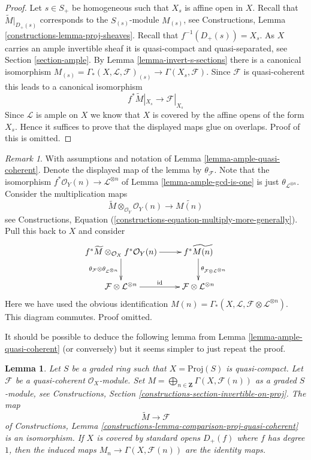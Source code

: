 \documentclass{stacks-project}
\theoremstyle{plain}
\newtheorem{lemma}[subsection]{Lemma}
\theoremstyle{definition}
\theoremstyle{remark}
\newtheorem{remark}[subsection]{Remark}
\numberwithin{equation}{subsection}
\begin{document}
\begin{proof}
Let $s \in S_{+}$ be homogeneous such that $X_s$ is affine open in $X$.
Recall that $\widetilde{M}|_{D_{+}(s)}$ corresponds to the
$S_{(s)}$-module $M_{(s)}$, see
Constructions, Lemma \ref{constructions-lemma-proj-sheaves}.
Recall that $f^{-1}(D_{+}(s)) = X_s$.
As $X$ carries an ample invertible sheaf it is quasi-compact and
quasi-separated, see Section \ref{section-ample}.
By Lemma \ref{lemma-invert-s-sections} there is a canonical isomorphism
$M_{(s)} = \Gamma_*(X, \mathcal{L}, \mathcal{F})_{(s)} \to
\Gamma(X_s, \mathcal{F})$.
Since $\mathcal{F}$ is quasi-coherent this leads to
a canonical isomorphism
$$
f^*\widetilde{M}|_{X_s} \to \mathcal{F}|_{X_s}
$$
Since $\mathcal{L}$ is ample on $X$ we know that $X$ is covered
by the affine opens of the form $X_s$. Hence it suffices to prove
that the displayed maps glue on overlaps. Proof of this is
omitted.
\end{proof}

\begin{remark}
\label{remark-neurotic}
With assumptions and notation of Lemma \ref{lemma-ample-quasi-coherent}.
Denote the displayed map of the lemma by $\theta_\mathcal{F}$.
Note that the isomorphism $f^*\mathcal{O}_Y(n) \to \mathcal{L}^{\otimes n}$
of Lemma \ref{lemma-ample-gcd-is-one} is just
$\theta_{\mathcal{L}^{\otimes n}}$.
Consider the multiplication maps
$$
\widetilde{M} \otimes_{\mathcal{O}_Y} \mathcal{O}_Y(n)
\longrightarrow
\widetilde{M(n)}
$$
see
Constructions, Equation (\ref{constructions-equation-multiply-more-generally}).
Pull this back to $X$ and consider
$$
\xymatrix{
f^*\widetilde{M} \otimes_{\mathcal{O}_X} f^*\mathcal{O}_Y(n)
\ar[r]
\ar[d]_{\theta_\mathcal{F} \otimes \theta_{\mathcal{L}^{\otimes n}}}
&
f^*\widetilde{M(n)}
\ar[d]^{\theta_{\mathcal{F} \otimes \mathcal{L}^{\otimes n}}}
\\
\mathcal{F} \otimes \mathcal{L}^{\otimes n} \ar[r]^{\text{id}} &
\mathcal{F} \otimes \mathcal{L}^{\otimes n}
}
$$
Here we have used the obvious identification
$M(n) = \Gamma_*(X, \mathcal{L}, \mathcal{F} \otimes \mathcal{L}^{\otimes n})$.
This diagram commutes. Proof omitted.
\end{remark}

\noindent
It should be possible to deduce the following lemma from
Lemma \ref{lemma-ample-quasi-coherent} (or conversely) but it seems
simpler to just repeat the proof.

\begin{lemma}
\label{lemma-proj-quasi-coherent}
Let $S$ be a graded ring such that $X = \text{Proj}(S)$ is quasi-compact.
Let $\mathcal{F}$ be a quasi-coherent $\mathcal{O}_X$-module. Set
$M = \bigoplus_{n \in \mathbf{Z}} \Gamma(X, \mathcal{F}(n))$ as
a graded $S$-module, see
Constructions, Section \ref{constructions-section-invertible-on-proj}.
The map
$$
\widetilde{M} \longrightarrow \mathcal{F}
$$
of Constructions, Lemma
\ref{constructions-lemma-comparison-proj-quasi-coherent}
is an isomorphism.
If $X$ is covered by standard opens $D_+(f)$ where $f$ has degree $1$,
then the induced maps
$M_n \to \Gamma(X, \mathcal{F}(n))$ are the identity maps.
\end{lemma}
\end{document}
